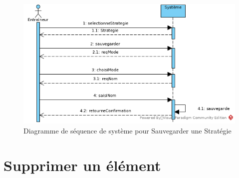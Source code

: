 \begin{figure}[htpb]
    \centering
    \includegraphics[scale=0.5]{fig/ssd_sauvegarder_strategie.png}
    \caption{Diagramme de s\'equence de syst\`eme pour Sauvegarder une Strat\'egie}
    \label{fig:ssd_sauvegarder_strategie}
\end{figure}


\section{Supprimer un \'el\'ement}
\label{sec:supprimer_un_'el'ement}

